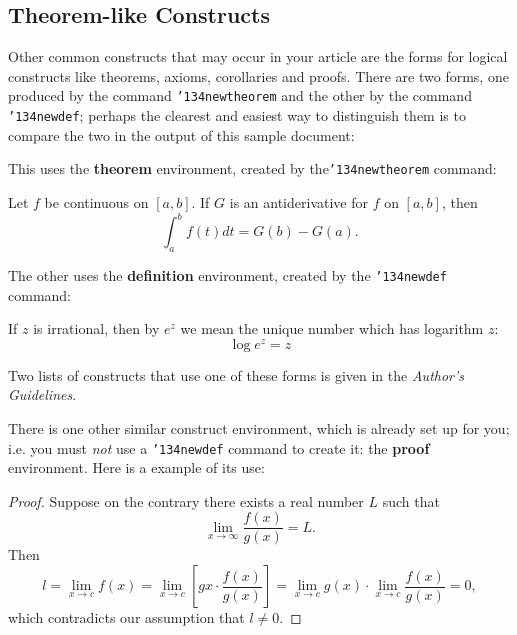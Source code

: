 \documentclass[sigconf]{nimepaper}
\begin{document}
\subsection{Theorem-like Constructs}
Other common constructs that may occur in your article are
the forms for logical constructs like theorems, axioms,
corollaries and proofs.  There are
two forms, one produced by the
command \texttt{{\char'134}newtheorem} and the
other by the command \texttt{{\char'134}newdef}; perhaps
the clearest and easiest way to distinguish them is
to compare the two in the output of this sample document:

This uses the \textbf{theorem} environment, created by
the\linebreak\texttt{{\char'134}newtheorem} command:
\begin{theorem}
Let $f$ be continuous on $[a,b]$.  If $G$ is
an antiderivative for $f$ on $[a,b]$, then
\begin{displaymath}\int^b_af(t)dt = G(b) - G(a).\end{displaymath}
\end{theorem}

The other uses the \textbf{definition} environment, created
by the \texttt{{\char'134}newdef} command:
\begin{definition}
If $z$ is irrational, then by $e^z$ we mean the
unique number which has
logarithm $z$: \begin{displaymath}{\log e^z = z}\end{displaymath}
\end{definition}

Two lists of constructs that use one of these
forms is given in the
\textit{Author's  Guidelines}.
 
There is one other similar construct environment, which is
already set up
for you; i.e. you must \textit{not} use
a \texttt{{\char'134}newdef} command to
create it: the \textbf{proof} environment.  Here
is a example of its use:
\begin{proof}
Suppose on the contrary there exists a real number $L$ such that
\begin{displaymath}
\lim_{x\rightarrow\infty} \frac{f(x)}{g(x)} = L.
\end{displaymath}
Then
\begin{displaymath}
l=\lim_{x\rightarrow c} f(x)
= \lim_{x\rightarrow c}
\left[ g{x} \cdot \frac{f(x)}{g(x)} \right ]
= \lim_{x\rightarrow c} g(x) \cdot \lim_{x\rightarrow c}
\frac{f(x)}{g(x)} = 0,
\end{displaymath}
which contradicts our assumption that $l\neq 0$.
\end{proof}
\end{document}
